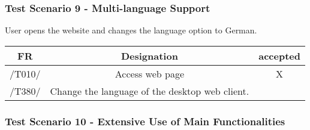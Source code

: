 \subsubsection{Test Scenario 9 - Multi-language Support}
User opens the website and changes the language option to German.
\begin{table}[h]
\begin{tabular}{!{\VRule}c!{\VRule}c!{\VRule}c!{\VRule}}
\hline
FR     & Designation                                                                    &accepted                \\
\hline
  /T010/ &  Access web page &   X  \\
 \hline
 /T380/  &  Change the language of the desktop web client.
 &     \\
 \hline
 
\end{tabular}
\end{table}
\subsubsection{Test Scenario 10 - Extensive Use of Main Functionalities}

